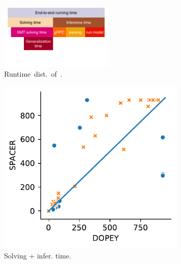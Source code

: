 \begin{figure}[t]
  \begin{subfigure}[b]{0.8\textwidth}
  \centering
    \includegraphics[width=0.6\textwidth]{figures/doping-flame.pdf}
    \caption{\mbox{Runtime~dist.~of~\dpy.}}
    \label{subfig:dpy_vs_spc_ind_gen}
	\end{subfigure}
  \centering
  \begin{subfigure}[b]{0.48\textwidth}
  \centering
    \includegraphics[width=0.99\textwidth]{figures/res-dpy_vs_spc_total.pdf}
    \caption{Solving + infer. time.}
    \label{subfig:dpy_vs_spc_total}
	\end{subfigure}
  \begin{subfigure}[b]{0.48\textwidth}
  \centering

\end{subfigure}
\end{figure}
